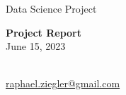\documentclass[
11pt, %
oneside, %
english, %
singlespacing, %
liststotoc, %
headsepline, %
chapterinoneline, %
consistentlayout, %
]{MastersDoctoralThesis} %
\author{\fname~ \lname} %
\institute{{}} %
\begin{document}
\frontmatter %

\pagestyle{plain} %


\begin{titlepage}
{
\vspace*{-3cm}
\hfill
}
 \begin{center}
\hypersetup{hidelinks} 
 \vspace*{.06\textheight}
  \vspace{3.0cm}
  {\Large Data Science Project}\\[1.0cm]
  {\Huge \bfseries \ttitle\par}\vspace{0.4cm} %
  {\Huge \bfseries Project Report}\\[1.0cm] %
  \Large June 15, 2023 \\[5.0cm]  %
  \vfill
  {\Large \authorname \\ 
   \href{mailto:raphael.ziegler@gmail.com}{raphael.ziegler@gmail.com} \par}\vspace{0.4cm} %



\end{center}
\end{titlepage}




\end{document}
